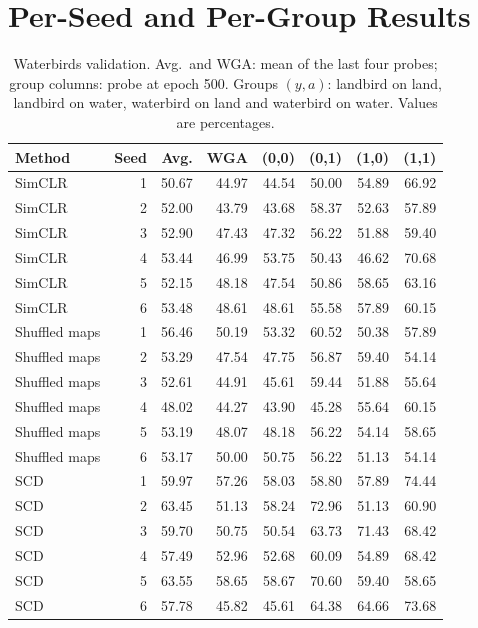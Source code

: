 \documentclass{article}
\begin{document}
\section{Per-Seed and Per-Group Results}
\label{app:seeds}
\begin{table}[htbp]
\centering\small
\setlength{\tabcolsep}{4pt}
\caption{Waterbirds validation. Avg.\ and WGA: mean of the last four probes; group columns: probe at epoch 500. Groups $(y,a)$: landbird on land, landbird on water, waterbird on land and waterbird on water. Values are percentages.}
\begin{tabular}{lrrrrrrr}
\toprule
Method & Seed & Avg. & WGA & (0,0) & (0,1) & (1,0) & (1,1) \\
\midrule
SimCLR & 1 & 50.67 & 44.97 & 44.54 & 50.00 & 54.89 & 66.92 \\
SimCLR & 2 & 52.00 & 43.79 & 43.68 & 58.37 & 52.63 & 57.89 \\
SimCLR & 3 & 52.90 & 47.43 & 47.32 & 56.22 & 51.88 & 59.40 \\
SimCLR & 4 & 53.44 & 46.99 & 53.75 & 50.43 & 46.62 & 70.68 \\
SimCLR & 5 & 52.15 & 48.18 & 47.54 & 50.86 & 58.65 & 63.16 \\
SimCLR & 6 & 53.48 & 48.61 & 48.61 & 55.58 & 57.89 & 60.15 \\
\addlinespace
Shuffled maps & 1 & 56.46 & 50.19 & 53.32 & 60.52 & 50.38 & 57.89 \\
Shuffled maps & 2 & 53.29 & 47.54 & 47.75 & 56.87 & 59.40 & 54.14 \\
Shuffled maps & 3 & 52.61 & 44.91 & 45.61 & 59.44 & 51.88 & 55.64 \\
Shuffled maps & 4 & 48.02 & 44.27 & 43.90 & 45.28 & 55.64 & 60.15 \\
Shuffled maps & 5 & 53.19 & 48.07 & 48.18 & 56.22 & 54.14 & 58.65 \\
Shuffled maps & 6 & 53.17 & 50.00 & 50.75 & 56.22 & 51.13 & 54.14 \\
\addlinespace
SCD & 1 & 59.97 & 57.26 & 58.03 & 58.80 & 57.89 & 74.44 \\
SCD & 2 & 63.45 & 51.13 & 58.24 & 72.96 & 51.13 & 60.90 \\
SCD & 3 & 59.70 & 50.75 & 50.54 & 63.73 & 71.43 & 68.42 \\
SCD & 4 & 57.49 & 52.96 & 52.68 & 60.09 & 54.89 & 68.42 \\
SCD & 5 & 63.55 & 58.65 & 58.67 & 70.60 & 59.40 & 58.65 \\
SCD & 6 & 57.78 & 45.82 & 45.61 & 64.38 & 64.66 & 73.68 \\
\bottomrule
\end{tabular}
\end{table}
\end{document}
